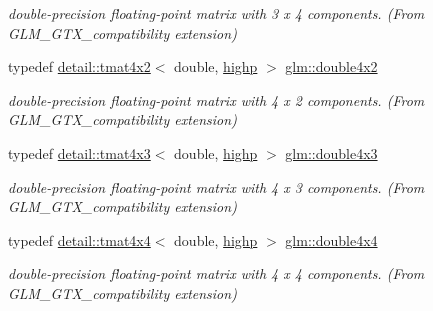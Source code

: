 \begin{DoxyCompactItemize}
\begin{DoxyCompactList}\small\item\em double-\/precision floating-\/point matrix with 3 x 4 components. (From G\+L\+M\+\_\+\+G\+T\+X\+\_\+compatibility extension) \end{DoxyCompactList}\item 
typedef \hyperlink{structglm_1_1detail_1_1tmat4x2}{detail\+::tmat4x2}$<$ double, \hyperlink{namespaceglm_a0f04f086094c747d227af4425893f545ac6f7eab42eacbb10d59a58e95e362074}{highp} $>$ \hyperlink{group__gtx__compatibility_ga816d1a516a5ec13511fe1ae703ddcf94}{glm\+::double4x2}
\begin{DoxyCompactList}\small\item\em double-\/precision floating-\/point matrix with 4 x 2 components. (From G\+L\+M\+\_\+\+G\+T\+X\+\_\+compatibility extension) \end{DoxyCompactList}\item 
typedef \hyperlink{structglm_1_1detail_1_1tmat4x3}{detail\+::tmat4x3}$<$ double, \hyperlink{namespaceglm_a0f04f086094c747d227af4425893f545ac6f7eab42eacbb10d59a58e95e362074}{highp} $>$ \hyperlink{group__gtx__compatibility_ga1199ee41226db53d5f190d0628041845}{glm\+::double4x3}
\begin{DoxyCompactList}\small\item\em double-\/precision floating-\/point matrix with 4 x 3 components. (From G\+L\+M\+\_\+\+G\+T\+X\+\_\+compatibility extension) \end{DoxyCompactList}\item 
typedef \hyperlink{structglm_1_1detail_1_1tmat4x4}{detail\+::tmat4x4}$<$ double, \hyperlink{namespaceglm_a0f04f086094c747d227af4425893f545ac6f7eab42eacbb10d59a58e95e362074}{highp} $>$ \hyperlink{group__gtx__compatibility_ga95e88bfe8dea34a6d4b30b1029c3e2da}{glm\+::double4x4}
\begin{DoxyCompactList}\small\item\em double-\/precision floating-\/point matrix with 4 x 4 components. (From G\+L\+M\+\_\+\+G\+T\+X\+\_\+compatibility extension) \end{DoxyCompactList}\end{DoxyCompactItemize}
